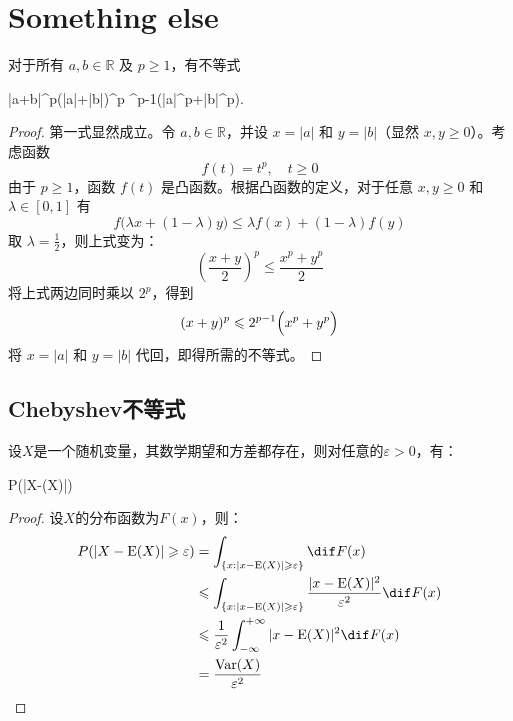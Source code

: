 \section{Something else}

\begin{theorem}
	对于所有 $a,b\in\mathbb{R}$ 及 $p\ge 1$，有不等式
	\begin{inequality*}\label{ineq:else-1}
		|a+b|^p\leqslant\Bigl(|a|+|b|\Bigr)^p ^{p-1}\Bigl(|a|^p+|b|^p\Bigr).
	\end{inequality*}
\end{theorem}
\begin{proof}
	第一式显然成立。令 $a,b\in\mathbb{R}$，并设 $x=|a|$ 和 $y=|b|$（显然 $x,y\geqslant0$）。考虑函数
	\begin{equation*}
		f(t)=t^p,\quad t\ge 0
	\end{equation*}
	由于 $p\geqslant1$，函数 $f(t)$ 是凸函数。根据凸函数的定义，对于任意 $x,y\ge 0$ 和 $\lambda\in[0,1]$ 有
	\begin{equation*}
		f\bigl(\lambda x+(1-\lambda)y\bigr)\leqslant\lambda f(x)+(1-\lambda)f(y)
	\end{equation*}
	取 $\lambda=\frac{1}{2}$，则上式变为：
	\begin{equation*}
		\left(\frac{x+y}{2}\right)^p\leqslant\frac{x^p+y^p}{2}
	\end{equation*}
	将上式两边同时乘以 $2^p$，得到
	\begin{equation*}
		(x+y)^p\leqslant2^{p-1}\Bigl(x^p+y^p\Bigr)
	\end{equation*}
	将 $x=|a|$ 和 $y=|b|$ 代回，即得所需的不等式。
\end{proof}

\subsection{Chebyshev不等式}
\begin{theorem}
	设$X$是一个随机变量，其数学期望和方差都存在，则对任意的$\varepsilon>0$，有：
	\begin{inequality*}\label{ineq:Chebyshev}
		P(|X-(X)|\geqslant\varepsilon)\leqslant{}
	\end{inequality*}
\end{theorem}
\begin{proof}
	设$X$的分布函数为$F(x)$，则：
	\begin{align*}
		P(|X-\operatorname{E}(X)|\geqslant\varepsilon)
		&=\int_{\{x:|x-\operatorname{E}(X)|\geqslant\varepsilon\}}^{}\dif F(x) \\
		&\leqslant\int_{\{x:|x-\operatorname{E}(X)|\geqslant\varepsilon\}}^{}\frac{|x-\operatorname{E}(X)|^2}{\varepsilon^2}\dif F(x) \\
		&\leqslant\frac{1}{\varepsilon^2}\int_{-\infty}^{+\infty}|x-\operatorname{E}(X)|^2\dif F(x) \\
		&=\frac{\operatorname{Var}(X)}{\varepsilon^2}\qedhere
	\end{align*}
\end{proof}